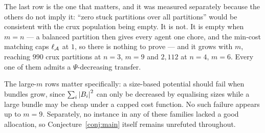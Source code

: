 The last row is the one that matters, and it was measured separately because the
others do not imply it: ``zero stuck partitions over all partitions'' would be
consistent with the crux population being empty. It is not. It is empty when
$m = n$ --- a balanced partition then gives every agent one chore, and the
min-cost matching caps $\ell_{\mathcal{A}}$ at $1$, so there is nothing to prove ---
and it grows with $m$, reaching $990$ crux partitions at $n=3$, $m=9$ and
$2{,}112$ at $n=4$, $m=6$. Every one of them admits a $\Psi$-decreasing transfer.

The large-$m$ rows matter specifically: a size-based potential should fail when
bundles grow, since $\sum_i \left\lvert B_i\right\rvert^2$ can only be decreased by equalising
sizes while a large bundle may be cheap under a capped cost function. No such
failure appears up to $m = 9$. Separately, no instance in any of these families
lacked a good allocation, so Conjecture~\ref{conj:main} itself remains unrefuted
throughout.
